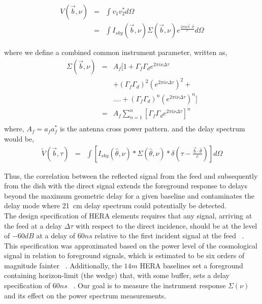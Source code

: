 \documentclass[twocolumn]{emulateapj}
\newcommand{\volt}{{v}}
\newcommand{\vis}{{V}}
\newcommand{\bmvolt}{{a}}
\newcommand{\beam}{{A}}
\newcommand{\thhat}{{\hat\theta}}
\newcommand{\fngexp}{{e^{\frac{2\pi i\nu\vec{b}\cdot\thhat}{c}}}}
\newcommand{\dfngexp}{{e^{2\pi i\nu \Delta \tau}}}
\begin{document}
\begin{eqnarray}\label{eqn:series1}
\vis(\vec b, \nu) & = & \int \volt_{1}\volt_{2}^{*} d\Omega \nonumber\\
			& = & \int I_{sky}(\vec b, \nu)\Sigma(\vec b, \nu) \fngexp d\Omega
\end{eqnarray}

where we define a combined common instrument parameter, written as, 
 \begin{eqnarray}
\Sigma(\vec b, \nu) & = & \beam_{f}  [ 1+  \Gamma_{f}\Gamma_{d} \dfngexp \nonumber\\
&& + (\Gamma_{f}\Gamma_{d})^2(\dfngexp)^{2}+ \nonumber\\
&&  ....+(\Gamma_{f}\Gamma_{d})^{n}(\dfngexp)^{n}  ]\\
& = & \beam_{f}\displaystyle\sum\limits_{n=1}^{n} [\Gamma_{f}\Gamma_{d}\dfngexp]^{n}
   \nonumber\\
   \label{eq6}
\end{eqnarray}
where, $\beam_{f}=\bmvolt_{f}\bmvolt_{f}^{*}$ is the antenna cross power pattern.
and the delay spectrum would be, 
\begin{eqnarray}
\tilde V(\vec b, \tau) & = & \int \left [ I_{sky}(\thhat, \nu) \ast \Sigma(\thhat, \nu) \ast \delta( \tau - \frac{{\vec {b} \cdot \thhat}}{c} )  \right] d\Omega
\label{eq7}
\end{eqnarray}
 
 Thus, the correlation between the reflected signal  from the feed and subsequently from the dish with the direct signal extends the foreground response to delays beyond the maximum geometric delay for a given baseline and contaminates the delay mode where 21~cm delay spectrum could potentially be detected. \\
The design specification of HERA elements requires that any
signal, arriving at the feed at a delay $\Delta \tau$ with respect to the direct incidence, should be
at the level of $-60dB$ at a delay of $60ns$ relative to the first incident
signal at the feed ~\citep{parsons_deboer_memo}. This specification was
approximated based on the power level of the cosmological signal in relation to
foreground signals, which is estimated to be six orders of magnitude fainter ~\citep{santos_et_al2005,ali_et_al2008,deoliveira2008,jelic_et_al2008,bernardi_et_al2009,bernardi_et_al2010,ghosh_et_al2011}. Additionally, the $14m$ HERA baselines set a foreground containing
horizon-limit (the wedge) that, with some buffer, sets a delay specification of
$60ns$
~\citep{parsons_et_al2012b,vedantham_et_al2012,nithya_et_al2013,liu_et_al2014a,liu_et_al2014b}. Our goal is to measure the instrument response $\Sigma(\nu)$ and its effect on the power spectrum measurements. 
\end{document}
